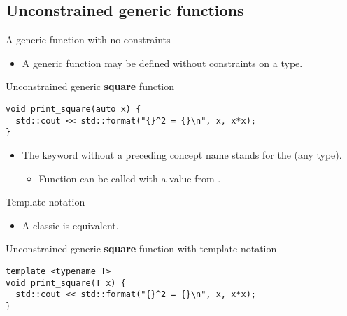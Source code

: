 \subsection{Unconstrained generic functions}

\begin{frame}[t,fragile]{A generic function with no constraints}
\begin{itemize}
  \item A generic function may be defined without constraints on
        a type.
\end{itemize}

\begin{block}{Unconstrained generic \textbf{square} function}
\begin{lstlisting}
void print_square(auto x) {
  std::cout << std::format("{}^2 = {}\n", x, x*x);
}
\end{lstlisting}
\end{block}

\begin{itemize}
  \item The keyword  without a preceding concept name
        stands for the  (any type).
    \begin{itemize}
      \item Function can be called with a value from .
    \end{itemize}
\end{itemize}
\end{frame}

\begin{frame}[t,fragile]{Template notation}
\begin{itemize}
  \item A classic  is equivalent.
\end{itemize}

\begin{block}{Unconstrained generic \textbf{square} function with template notation}
\begin{lstlisting}
template <typename T>
void print_square(T x) {
  std::cout << std::format("{}^2 = {}\n", x, x*x);
}
\end{lstlisting}
\end{block}
\end{frame}

